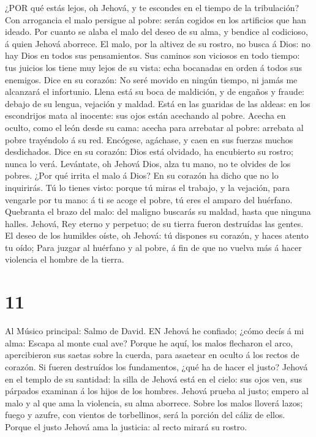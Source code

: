  ¿POR qué estás lejos, oh Jehová, y te escondes en el tiempo
de la tribulación?  Con arrogancia el malo persigue al
pobre: serán cogidos en los artificios que han ideado.  Por
cuanto se alaba el malo del deseo de su alma, y bendice al codicioso, á
quien Jehová aborrece.  El malo, por la altivez de su
rostro, no busca á Dios: no hay Dios en todos sus pensamientos.
 Sus caminos son viciosos en todo tiempo: tus juicios los
tiene muy lejos de su vista: echa bocanadas en orden á todos sus
enemigos.  Dice en su corazón: No seré movido en ningún
tiempo, ni jamás me alcanzará el infortunio.  Llena está su
boca de maldición, y de engaños y fraude: debajo de su lengua, vejación
y maldad.  Está en las guaridas de las aldeas: en los
escondrijos mata al inocente: sus ojos están acechando al pobre.
 Acecha en oculto, como el león desde su cama: acecha para
arrebatar al pobre: arrebata al pobre trayéndolo á su red. 
Encógese, agáchase, y caen en sus fuerzas muchos desdichados.
 Dice en su corazón: Dios está olvidado, ha encubierto su
rostro; nunca lo verá.  Levántate, oh Jehová Dios, alza tu
mano, no te olvides de los pobres.  ¿Por qué irrita el malo
á Dios? En su corazón ha dicho que no lo inquirirás.  Tú lo
tienes visto: porque tú miras el trabajo, y la vejación, para vengarle
por tu mano: á ti se acoge el pobre, tú eres el amparo del huérfano.
 Quebranta el brazo del malo: del maligno buscarás su
maldad, hasta que ninguna halles.  Jehová, Rey eterno y
perpetuo; de su tierra fueron destruídas las gentes.  El
deseo de los humildes oíste, oh Jehová: tú dispones su corazón, y haces
atento tu oído;  Para juzgar al huérfano y al pobre, á fin
de que no vuelva más á hacer violencia el hombre de la tierra.

\hypertarget{section-10}{%
\section{11}\label{section-10}}

 Al Músico principal: Salmo de David. EN Jehová he confiado;
¿cómo decís á mi alma: Escapa al monte cual ave?  Porque he
aquí, los malos flecharon el arco, apercibieron sus saetas sobre la
cuerda, para asaetear en oculto á los rectos de corazón.  Si
fueren destruídos los fundamentos, ¿qué ha de hacer el justo?
 Jehová en el templo de su santidad: la silla de Jehová está
en el cielo: sus ojos ven, sus párpados examinan á los hijos de los
hombres.  Jehová prueba al justo; empero al malo y al que
ama la violencia, su alma aborrece.  Sobre los malos lloverá
lazos; fuego y azufre, con vientos de torbellinos, será la porción del
cáliz de ellos.  Porque el justo Jehová ama la justicia: al
recto mirará su rostro.

